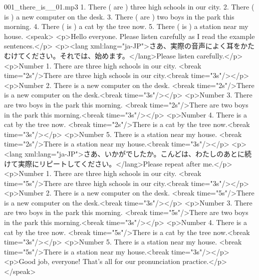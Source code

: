 001_there_is__01.mp3
1. There ( are ) three high schools in our city.
2. There ( is ) a new computer on the desk.
3. There ( are ) two boys in the park this morning.
4. There ( is ) a cat by the tree now.
5. There ( is ) a station near my house.
<speak>
<p>Hello everyone. Please listen carefully as I read the example sentences.</p>
<p><lang xml:lang="ja-JP">さあ、実際の音声によく耳をかたむけてください。それでは、始めます。</lang>Please listen carefully.</p>
<p>Number 1. There are three high schools in our city. <break time="2s"/>There are three high schools in our city.<break time="3s"/></p>
<p>Number 2. There is a new computer on the desk. <break time="2s"/>There is a new computer on the desk.<break time="3s"/></p>
<p>Number 3. There are two boys in the park this morning. <break time="2s"/>There are two boys in the park this morning.<break time="3s"/></p>
<p>Number 4. There is a cat by the tree now. <break time="2s"/>There is a cat by the tree now.<break time="3s"/></p>
<p>Number 5. There is a station near my house. <break time="2s"/>There is a station near my house.<break time="3s"/></p>
<p><lang xml:lang="ja-JP">さあ、いかがでしたか。こんどは、わたしのあとに続けて実際にリピートしてください。</lang>Please repeat after me.</p>
<p>Number 1.  There are three high schools in our city. <break time="5s"/>There are three high schools in our city.<break time="3s"/></p>
<p>Number 2.  There is a new computer on the desk. <break time="5s"/>There is a new computer on the desk.<break time="3s"/></p>
<p>Number 3.  There are two boys in the park this morning. <break time="5s"/>There are two boys in the park this morning.<break time="3s"/></p>
<p>Number 4.  There is a cat by the tree now. <break time="5s"/>There is a cat by the tree now.<break time="3s"/></p>
<p>Number 5.  There is a station near my house. <break time="5s"/>There is a station near my house.<break time="3s"/></p>
<p>Good job, everyone! That's all for our pronunciation practice.</p>
</speak>
